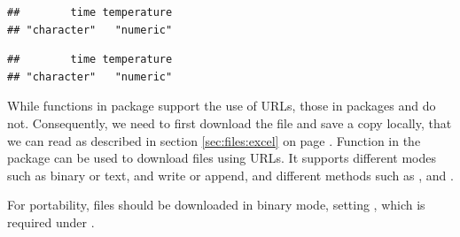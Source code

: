 \documentclass[krantz2]{krantz}\usepackage{knitr}
\begin{document}
\begin{knitrout}\footnotesize
{}\color{fgcolor}\begin{kframe}
\begin{alltt}
 \hlkwb{<-}
    \hlstd{(} \hlstd{=} \hlstd{,}
               \hlstd{=} \hlstd{(}\hlstd{,} \hlstd{))}
\end{alltt}


{\ttfamily\noindent\itshape\color{messagecolor}{\#\# Using ',' as decimal and '.' as grouping mark. Use read\_delim() for more control.}}

{\ttfamily\noindent\itshape\color{messagecolor}{\#\# Parsed with column specification:\\\#\# cols(\\\#\#\ \  time = col\_character(),\\\#\#\ \  temperature = col\_double()\\\#\# )}}\begin{alltt}
\end{alltt}
\begin{verbatim}
##        time temperature
## "character"   "numeric"
\end{verbatim}
\begin{alltt}
\end{alltt}
\begin{verbatim}
##        time temperature
## "character"   "numeric"
\end{verbatim}
\end{kframe}
\end{knitrout}

While functions in package  support the use of URLs, those in packages  and  do not. Consequently, we need to first download the file and save a copy locally, that we can read as described in section \ref{sec:files:excel} on page \pageref{sec:files:excel}. Function  in the \Rlang {} package can be used to download files using URLs. It supports different modes such as binary or text, and write or append, and different methods such as ,  and .

\begin{warningbox}
For portability,  files should be downloaded in binary mode, setting , which is required under .
\end{warningbox}
\end{document}
